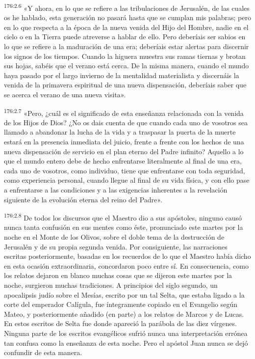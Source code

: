 \par 
\textsuperscript{176:2.6} «Y ahora, en lo que se refiere a las tribulaciones de Jerusalén, de las cuales os he hablado, esta generación no pasará hasta que se cumplan mis palabras; pero en lo que respecta a la época de la nueva venida del Hijo del Hombre, nadie en el cielo o en la Tierra puede atreverse a hablar de ello. Pero deberíais ser sabios en lo que se refiere a la maduración de una era; deberíais estar alertas para discernir los signos de los tiempos. Cuando la higuera muestra sus ramas tiernas y brotan sus hojas, sabéis que el verano está cerca. De la misma manera, cuando el mundo haya pasado por el largo invierno de la mentalidad materialista y discernáis la venida de la primavera espiritual de una nueva dispensación, deberíais saber que se acerca el verano de una nueva visita».

\par 
\textsuperscript{176:2.7} «Pero, ¿cuál es el significado de esta enseñanza relacionada con la venida de los Hijos de Dios? ¿No os dais cuenta de que cuando cada uno de vosotros sea llamado a abandonar la lucha de la vida y a traspasar la puerta de la muerte estará en la presencia inmediata del juicio, frente a frente con los hechos de una nueva dispensación de servicio en el plan eterno del Padre infinito? Aquello a lo que el mundo entero debe de hecho enfrentarse literalmente al final de una era, cada uno de vosotros, como individuo, tiene que enfrentarse con toda seguridad, como experiencia personal, cuando llegue al final de su vida física, y con ello pase a enfrentarse a las condiciones y a las exigencias inherentes a la revelación siguiente de la evolución eterna del reino del Padre».

\par 
\textsuperscript{176:2.8} De todos los discursos que el Maestro dio a sus apóstoles, ninguno causó nunca tanta confusión en sus mentes como éste, pronunciado este martes por la noche en el Monte de los Olivos, sobre el doble tema de la destrucción de Jerusalén y de su propia segunda venida. Por consiguiente, las narraciones escritas posteriormente, basadas en los recuerdos de lo que el Maestro había dicho en esta ocasión extraordinaria, concordaron poco entre sí. En consecuencia, como los relatos dejaron en blanco muchas cosas que se dijeron este martes por la noche, surgieron muchas tradiciones. A principios del siglo segundo, un apocalipsis judío sobre el Mesías, escrito por un tal Selta, que estaba ligado a la corte del emperador Calígula, fue íntegramente copiado en el Evangelio según Mateo, y posteriormente añadido (en parte) a los relatos de Marcos y de Lucas. En estos escritos de Selta fue donde apareció la parábola de las diez vírgenes. Ninguna parte de los escritos evangélicos sufrió nunca una interpretación errónea tan confusa como la enseñanza de esta noche. Pero el apóstol Juan nunca se dejó confundir de esta manera.

